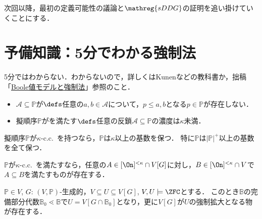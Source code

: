 \documentclass[a4j,leqno]{ltjsarticle}
\renewcommand{\emph}[1]{\textgt{\textsf{#1}}}
\newcommand{\sDDG}{\mathreg{sDDG}}
\theoremstyle{nonumberplain}
\begin{document}
次回以降，最初の定義可能性の議論と$\sDDG$の証明を追い掛けていくことにする．

\section{予備知識：5分でわかる強制法}
5分ではわからない．わからないので，詳しくはKunen\cite{Kunen:2011}などの教科書か，拙稿「\href{http://konn-san.com/math/boolean-valued-model-and-forcing.html}{Boole値モデルと強制法}」参照のこと．
\begin{definition}
 \begin{itemize}
  \item $\mathcal{A} \subseteq \mathbb{P}$が\emph{反鎖}$\defs$任意の$a, b \in \mathcal{A}$について，$p \leq a, b$となる$p \in \mathbb{P}$が存在しない．
  \item 擬順序$\mathbb{P}$が\emph{$\kappa$-c.c.}を満たす$\defs$任意の反鎖$\mathcal{A} \subseteq \mathbb{P}$の濃度は$\kappa$未満．
 \end{itemize}
\end{definition}
\begin{lemma}\label{lem:card-pres}
 擬順序$\mathbb{P}$が$\kappa$-c.c.\ を持つなら，$\mathbb{P}$は$\kappa$以上の基数を保つ．
 特に$\mathbb{P}$は$|\mathbb{P}|^+$以上の基数を全て保つ．
\end{lemma}

\begin{lemma}\label{lem:cc-to-cov}
 $\mathbb{P}$が$\kappa$-c.c.\ を満たすなら，任意の$A \in [\On]^{<\kappa} \cap V[G]$に対し，$B \in [\On]^{<\kappa} \cap V$で$A \subseteq B$を満たすものが存在する．
\end{lemma}

\begin{lemma}\label{lem:interm-ext}
 $\mathbb{P} \in V$, $G$: $(V, \mathbb{P})$-生成的，$V \subseteq U \subseteq V[G]$, $V, U \models \ZFC$とする．
 このとき$\mathbb{B}$の完備部分代数$\mathbb{B}_0 \lessdot \mathbb{B}$で$U = V[G \cap \mathbb{B}_0]$となり，更に$V[G]$が$U$の強制拡大となる物が存在する．
\end{lemma}
\end{document}
